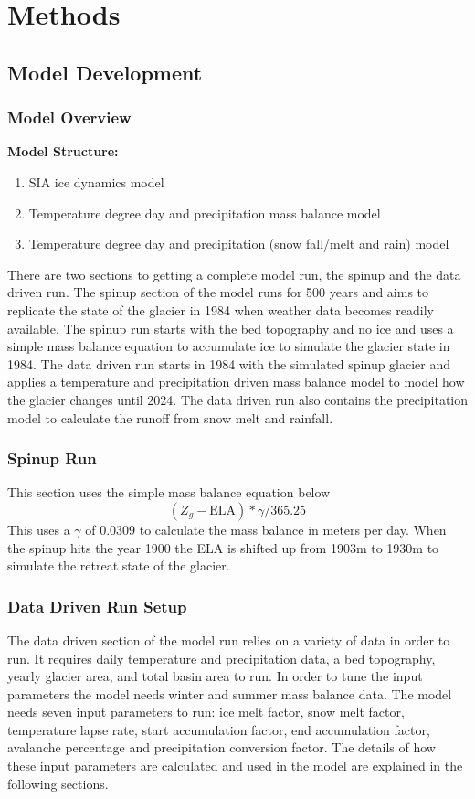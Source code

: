 \documentclass{article}
\begin{document}
\section{Methods}
\subsection{Model Development}
\subsubsection{Model Overview}
\textbf{Model Structure:}
\begin{enumerate}[leftmargin=2cm]
    \item SIA ice dynamics model
    \item Temperature degree day and precipitation mass balance model
    \item Temperature degree day and precipitation (snow fall/melt and rain) model
\end{enumerate}

There are two sections to getting a complete model run, the spinup and the data driven run. The spinup section of the model runs for 500 years and aims to replicate the 
state of the glacier in 1984 when weather data becomes readily available. The spinup run starts with the bed topography and no ice and uses a simple mass balance 
equation to accumulate ice to simulate the glacier state in 1984. The data driven run starts in 1984 with the simulated spinup glacier and applies a temperature and 
precipitation driven mass balance model to model how the glacier changes until 2024. The data driven run also contains the precipitation model to calculate the runoff 
from snow melt and rainfall.

\subsubsection{Spinup Run}
This section uses the simple mass balance equation below
\begin{equation}(Z_g-\text{ELA})*\gamma /365.25\end{equation}
This uses a $\gamma$ of 0.0309 to calculate the mass balance in meters per day. When the spinup hits the year 1900 the ELA is shifted up from 1903m to 1930m to simulate the 
retreat state of the glacier. 

\subsubsection{Data Driven Run Setup}
The data driven section of the model run relies on a variety of data in order to run. It requires daily temperature and precipitation data, 
a bed topography, yearly glacier area, and total basin area to run. In order to tune the input parameters the model needs winter and summer mass balance 
data. The model needs seven input parameters to run: ice melt factor, snow melt factor, temperature lapse rate, start accumulation factor, end 
accumulation factor, avalanche percentage and precipitation conversion factor. The details of how these input parameters are calculated and used 
in the model are explained in the following sections.
\end{document}
